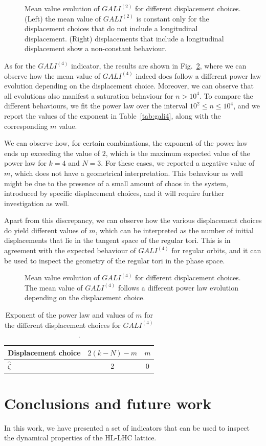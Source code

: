 \begin{figure}
    \centering
    \caption{Mean value evolution of $GALI^{(2)}$ for different displacement choices. (Left) the mean value of $GALI^{(2)}$ is constant only for the displacement choices that do not include a longitudinal displacement. (Right) displacements that include a longitudinal displacement show a non-constant behaviour.}
    \label{fig:gali2}
\end{figure}

As for the $GALI^{(4)}$ indicator, the results are shown in Fig.~\ref{fig:gali4}, where we can observe how the mean value of $GALI^{(4)}$ indeed does follow a different power law evolution depending on the displacement choice. Moreover, we can observe that all evolutions also manifest a saturation behaviour for $n>10^4$. To compare the different behaviours, we fit the power law over the interval $10^2\leq n \leq 10^4$, and we report the values of the exponent in Table~\ref{tab:gali4}, along with the corresponding $m$ value.

We can observe how, for certain combinations, the exponent of the power law ends up exceeding the value of $2$, which is the maximum expected value of the power law for $k=4$ and $N=3$. For these cases, we reported a negative value of $m$, which does not have a geometrical interpretation. This behaviour as well might be due to the presence of a small amount of chaos in the system, introduced by specific displacement choices, and it will require further investigation as well.

Apart from this discrepancy, we can observe how the various displacement choices do yield different values of $m$, which can be interpreted as the number of initial displacements that lie in the tangent space of the regular tori. This is in agreement with the expected behaviour of $GALI^{(4)}$ for regular orbits, and it can be used to inspect the geometry of the regular tori in the phase space.

\begin{figure}
    \centering
    \caption{Mean value evolution of $GALI^{(4)}$ for different displacement choices. The mean value of $GALI^{(4)}$ follows a different power law evolution depending on the displacement choice.}
    \label{fig:gali4}
\end{figure}

\begin{table}
    \centering
    \begin{tabular}{l|cc}
        \toprule
        Displacement choice & $2(k-N)-m$ & $m$ \\
        \midrule
        $\hat{\zeta}$ & 2 & 0 \\
        \bottomrule        
    \end{tabular}
    \caption{Exponent of the power law and values of $m$ for the different displacement choices for $GALI^{(4)}$.}
\end{table}


\section{Conclusions and future work}

In this work, we have presented a set of indicators that can be used to inspect the dynamical properties of the HL-LHC lattice.